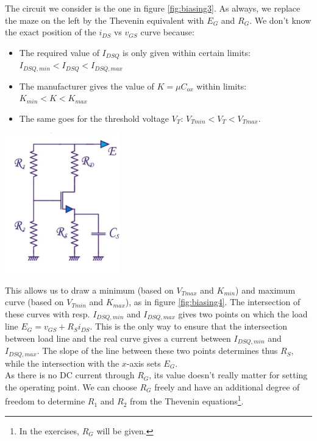 \begin{minipage}{.5\textwidth}
	The circuit we consider is the one in figure \ref{fig:biasing3}. As always, we replace the maze on the left by the Thevenin equivalent with $E_G$ and $R_G$. We don't know the exact position of the $i_{DS}$ vs $v_{GS}$ curve because:
	\begin{itemize}
		\item The required value of $I_{DSQ}$ is only given within certain limits:\\ $I_{DSQ, min} < I_{DSQ} < I_{DSQ, max}$
		\item The manufacturer gives the value of $K=\mu C_{ox}$ within limits: $K_{min} < K < K_{max}$
		\item The same goes for the threshold voltage $V_T$: $V_{Tmin} < V_T < V_{Tmax}$.
	\end{itemize}
	
\end{minipage}%
\begin{minipage}{.4\textwidth}
	\centering
	\includegraphics[width=5cm]{figures/ch02/biasing3.jpg}
	\label{fig:biasing3}
\end{minipage}


This allows us to draw a minimum (based on $V_{Tmax}$ and $K_{min}$) and maximum curve (based on $V_{Tmin}$ and $K_{max}$), as in figure \ref{fig:biasing4}. The intersection of these curves with resp. $I_{DSQ, min}$ and $I_{DSQ, max}$ gives two points on which the load line $E_G = v_{GS} + R_S i_{DS}$.  This is the only way to ensure that the intersection between load line and the real curve gives a current between $I_{DSQ, min}$ and $I_{DSQ, max}$. The slope of the line between these two points determines thus $R_S$, while the intersection with the $x$-axis sets $E_G$.\\
As there is no DC current through $R_G$, its value doesn't really matter for setting the operating point. We can choose $R_G$ freely and have an additional degree of freedom to determine $R_1$ and $R_2$ from the Thevenin equations\footnote{In the exercises, $R_G$ will be given.}.

